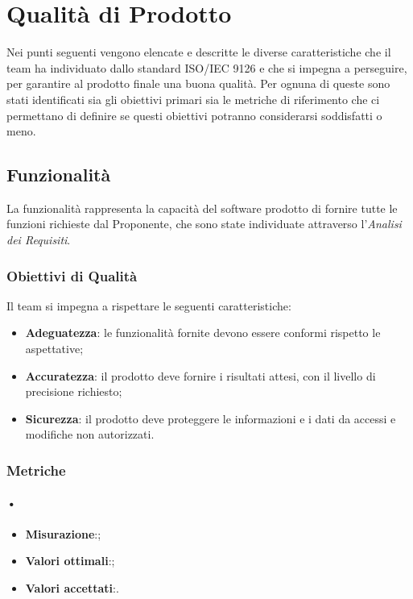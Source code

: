 \section{Qualità di Prodotto}
Nei punti seguenti vengono elencate e descritte le diverse caratteristiche che il team ha individuato dallo standard ISO/IEC 9126 e che si impegna a perseguire, per garantire al prodotto finale una buona qualità. Per ognuna di queste sono stati identificati sia gli obiettivi primari sia le metriche di riferimento che ci permettano di definire se questi obiettivi potranno considerarsi soddisfatti o meno. 	

\subsection{Funzionalità}
La funzionalità rappresenta la capacità del software prodotto di fornire tutte le funzioni richieste dal Proponente, che sono state individuate attraverso l'\textit{Analisi dei Requisiti}.

\subsubsection{Obiettivi di Qualità}
Il team si impegna a rispettare le seguenti caratteristiche:
\begin{itemize}
\item \textbf{Adeguatezza}: le funzionalità fornite devono essere conformi rispetto le aspettative;
\item \textbf{Accuratezza}: il prodotto deve fornire i risultati attesi, con il livello di precisione richiesto;
\item \textbf{Sicurezza}: il prodotto deve proteggere le informazioni e i dati da accessi e modifiche non autorizzati.
\end{itemize}

\subsubsection{Metriche}

\paragraph{•}
\begin{itemize}
\item \textbf{Misurazione}:;
\item \textbf{Valori ottimali}:;
\item \textbf{Valori accettati}:.
\end{itemize}

